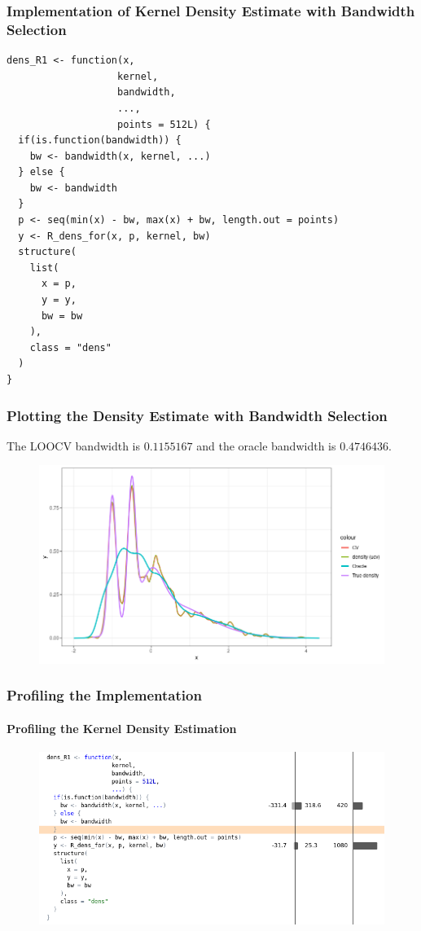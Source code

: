 \documentclass[aspectratio=169]{beamer}
\begin{document}
\begin{frame}[fragile]
  \frametitle{Implementation of Kernel Density Estimate with Bandwidth Selection}
\begin{verbatim}
dens_R1 <- function(x,
                   kernel,
                   bandwidth,
                   ...,
                   points = 512L) {
  if(is.function(bandwidth)) {
    bw <- bandwidth(x, kernel, ...)
  } else {
    bw <- bandwidth
  }
  p <- seq(min(x) - bw, max(x) + bw, length.out = points)
  y <- R_dens_for(x, p, kernel, bw)
  structure(
    list(
      x = p,
      y = y,
      bw = bw
    ),
    class = "dens"
  )
}
\end{verbatim}
\end{frame}
\begin{frame}
  \frametitle{Plotting the Density Estimate with Bandwidth Selection}
  The LOOCV bandwidth is $0.1155167$ and the oracle bandwidth is $0.4746436$.
  \begin{figure}
    \centering
    \includegraphics[scale = 0.5]{figure/application.png}
  \end{figure}
\end{frame}
\begin{frame}[fragile]
  \frametitle{Profiling the Implementation}
  \framesubtitle{Profiling the Kernel Density Estimation}
  \begin{figure}
    \centering
    \includegraphics[scale = 0.5]{figure/density_profile.png}
  \end{figure}
\end{frame}
\end{document}
